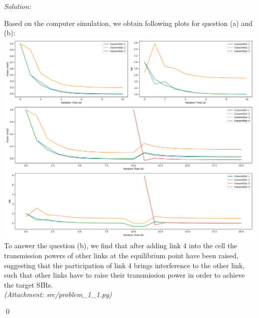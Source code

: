 \documentclass[12pt]{article}
\newenvironment{sol}
    {\emph{Solution:}
    }
    {
    \qed
    }
\begin{document}
\begin{sol}
	Based on the computer simulation, we obtain following plots for question (a) and (b): \\
	\includegraphics[width=\linewidth, height=0.5\textheight]{../assets/myplot.png}\\
	To answer the question (b), we find that after adding link 4 into the cell the transmission powers of other links at the equilibrium point have been raised, suggesting that the participation of link 4 brings interference to the other link, such that other links have to raise their transmission power in order to achieve the target SIRs. \\
	\textit{(Attachment: src/problem\_1\_1.py)}
\end{sol}
\end{document}
